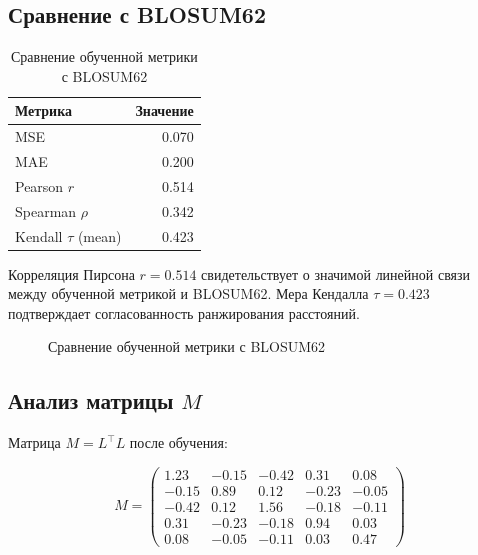 \documentclass[12pt]{article}
\begin{document}
\subsection{Сравнение с BLOSUM62}

\begin{table}[h]
\centering
\caption{Сравнение обученной метрики с BLOSUM62}
\label{tab:blosum_comparison}
\begin{tabular}{lr}
\toprule
\textbf{Метрика} & \textbf{Значение} \\
\midrule
MSE & 0.070 \\
MAE & 0.200 \\
Pearson $r$ & 0.514 \\
Spearman $\rho$ & 0.342 \\
Kendall $\tau$ (mean) & 0.423 \\
\bottomrule
\end{tabular}
\end{table}

Корреляция Пирсона $r = 0.514$ свидетельствует о значимой линейной связи между обученной метрикой и BLOSUM62. Мера Кендалла $\tau = 0.423$ подтверждает согласованность ранжирования расстояний.

\begin{figure}[h]
\centering
\caption{Сравнение обученной метрики с BLOSUM62}
\label{fig:blosum_scatter}
\end{figure}

\subsection{Анализ матрицы $M$}

Матрица $M = L^{\top}L$ после обучения:

\begin{equation}
M = \begin{pmatrix}
1.23 & -0.15 & -0.42 & 0.31 & 0.08 \\
-0.15 & 0.89 & 0.12 & -0.23 & -0.05 \\
-0.42 & 0.12 & 1.56 & -0.18 & -0.11 \\
0.31 & -0.23 & -0.18 & 0.94 & 0.03 \\
0.08 & -0.05 & -0.11 & 0.03 & 0.47
\end{pmatrix}
\label{eq:M_matrix}
\end{equation}
\end{document}
